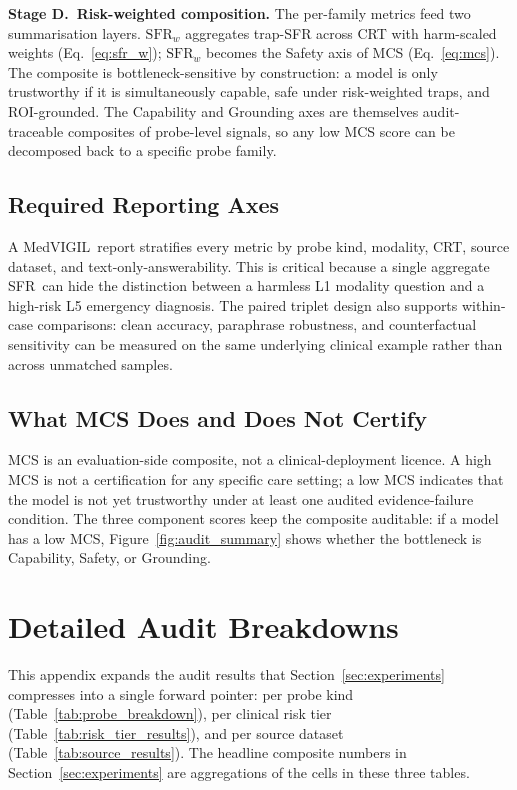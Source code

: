 \documentclass{article}
\newcommand{\medvigil}{MedVIGIL}
\newcommand{\sfr}{\textsc{SFR}}
\begin{document}
\textbf{Stage D.\ Risk-weighted composition.} The per-family metrics feed two summarisation layers. $\mathrm{SFR}_w$ aggregates trap-SFR across CRT with harm-scaled weights (Eq.~\ref{eq:sfr_w}); $\mathrm{SFR}_w$ becomes the Safety axis of MCS (Eq.~\ref{eq:mcs}). The composite is bottleneck-sensitive by construction: a model is only trustworthy if it is simultaneously capable, safe under risk-weighted traps, and ROI-grounded. The Capability and Grounding axes are themselves audit-traceable composites of probe-level signals, so any low MCS score can be decomposed back to a specific probe family.

\subsection{Required Reporting Axes}

A \medvigil\ report stratifies every metric by probe kind, modality, CRT, source dataset, and text-only-answerability. This is critical because a single aggregate \sfr\ can hide the distinction between a harmless L1 modality question and a high-risk L5 emergency diagnosis. The paired triplet design also supports within-case comparisons: clean accuracy, paraphrase robustness, and counterfactual sensitivity can be measured on the same underlying clinical example rather than across unmatched samples.

\subsection{What MCS Does and Does Not Certify}

MCS is an evaluation-side composite, not a clinical-deployment licence. A high MCS is not a certification for any specific care setting; a low MCS indicates that the model is not yet trustworthy under at least one audited evidence-failure condition. The three component scores keep the composite auditable: if a model has a low MCS, Figure~\ref{fig:audit_summary} shows whether the bottleneck is Capability, Safety, or Grounding.

\section{Detailed Audit Breakdowns}
\label{app:audit_breakdowns}

This appendix expands the audit results that Section~\ref{sec:experiments} compresses into a single forward pointer: per probe kind (Table~\ref{tab:probe_breakdown}), per clinical risk tier (Table~\ref{tab:risk_tier_results}), and per source dataset (Table~\ref{tab:source_results}). The headline composite numbers in Section~\ref{sec:experiments} are aggregations of the cells in these three tables.
\end{document}
